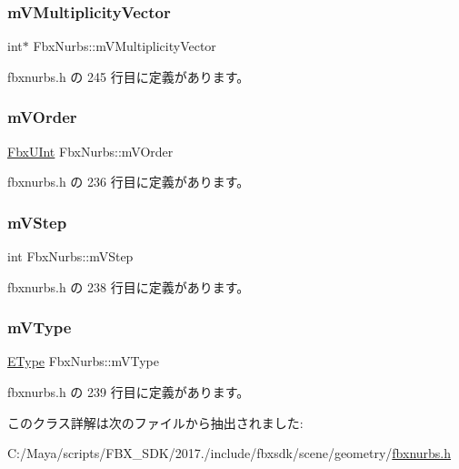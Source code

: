 \subsubsection{\texorpdfstring{m\+V\+Multiplicity\+Vector}{mVMultiplicityVector}}
{\footnotesize\ttfamily int$\ast$ Fbx\+Nurbs\+::m\+V\+Multiplicity\+Vector\hspace{0.3cm}{\ttfamily [protected]}}



 fbxnurbs.\+h の 245 行目に定義があります。

\mbox{\label{class_fbx_nurbs_a5e4a956f463a54a8c5b966f0799280c5}} 
\subsubsection{\texorpdfstring{m\+V\+Order}{mVOrder}}
{\footnotesize\ttfamily \hyperlink{fbxtypes_8h_ae9fb141d8158a730aa85ec5ff2ea3f6b}{Fbx\+U\+Int} Fbx\+Nurbs\+::m\+V\+Order\hspace{0.3cm}{\ttfamily [protected]}}



 fbxnurbs.\+h の 236 行目に定義があります。

\mbox{\label{class_fbx_nurbs_a209ec06ea941b6dea3f68d85b3461d21}} 
\subsubsection{\texorpdfstring{m\+V\+Step}{mVStep}}
{\footnotesize\ttfamily int Fbx\+Nurbs\+::m\+V\+Step\hspace{0.3cm}{\ttfamily [protected]}}



 fbxnurbs.\+h の 238 行目に定義があります。

\mbox{\label{class_fbx_nurbs_ad973e3ca7ca7a3d6d3be94e46153a55b}} 
\subsubsection{\texorpdfstring{m\+V\+Type}{mVType}}
{\footnotesize\ttfamily \hyperlink{class_fbx_nurbs_a16d9562676c9d3511503551790c55643}{E\+Type} Fbx\+Nurbs\+::m\+V\+Type\hspace{0.3cm}{\ttfamily [protected]}}



 fbxnurbs.\+h の 239 行目に定義があります。



このクラス詳解は次のファイルから抽出されました\+:\begin{DoxyCompactItemize}
\item 
C\+:/\+Maya/scripts/\+F\+B\+X\+\_\+\+S\+D\+K/2017./include/fbxsdk/scene/geometry/\hyperlink{fbxnurbs_8h}{fbxnurbs.\+h}\end{DoxyCompactItemize}

